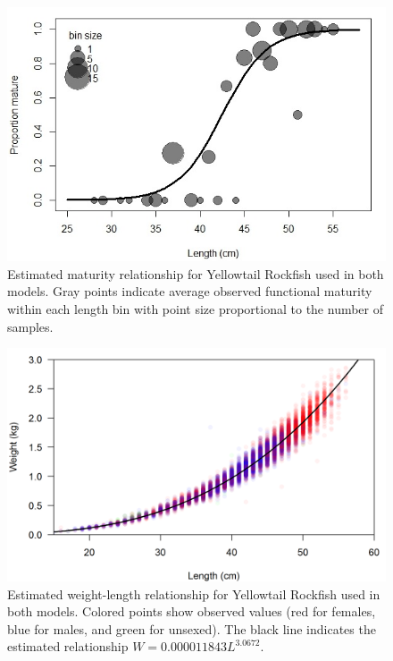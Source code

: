 \documentclass[12pt,]{article}
\begin{document}
\begin{figure}[htbp]
\centering
\includegraphics{Figures/YT_Propmat_update3_22.jpeg}
\caption{Estimated maturity relationship for Yellowtail Rockfish used in
both models. Gray points indicate average observed functional maturity
within each length bin with point size proportional to the number of
samples.\label{fig:maturity}}
\end{figure}

\begin{figure}[htbp]
\centering
\includegraphics{Figures/weight-length_fit.png}
\caption{Estimated weight-length relationship for Yellowtail Rockfish
used in both models. Colored points show observed values (red for
females, blue for males, and green for unsexed). The black line
indicates the estimated relationship
\(W = 0.000011843L^{3.0672}\).\label{fig:weight-length}}
\end{figure}

\FloatBarrier
\end{document}
